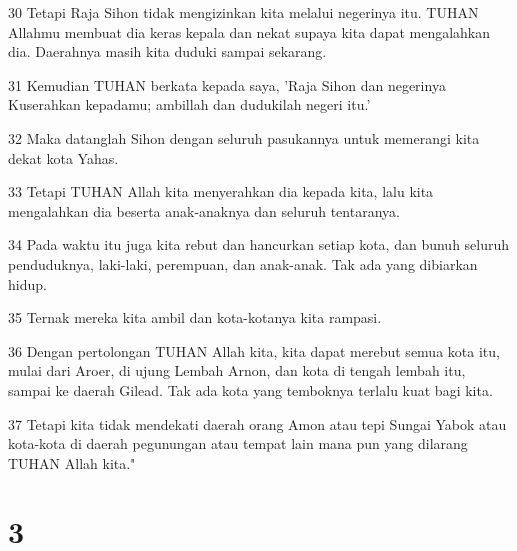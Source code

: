 \par 30 Tetapi Raja Sihon tidak mengizinkan kita melalui negerinya itu. TUHAN Allahmu membuat dia keras kepala dan nekat supaya kita dapat mengalahkan dia. Daerahnya masih kita duduki sampai sekarang.
\par 31 Kemudian TUHAN berkata kepada saya, 'Raja Sihon dan negerinya Kuserahkan kepadamu; ambillah dan dudukilah negeri itu.'
\par 32 Maka datanglah Sihon dengan seluruh pasukannya untuk memerangi kita dekat kota Yahas.
\par 33 Tetapi TUHAN Allah kita menyerahkan dia kepada kita, lalu kita mengalahkan dia beserta anak-anaknya dan seluruh tentaranya.
\par 34 Pada waktu itu juga kita rebut dan hancurkan setiap kota, dan bunuh seluruh penduduknya, laki-laki, perempuan, dan anak-anak. Tak ada yang dibiarkan hidup.
\par 35 Ternak mereka kita ambil dan kota-kotanya kita rampasi.
\par 36 Dengan pertolongan TUHAN Allah kita, kita dapat merebut semua kota itu, mulai dari Aroer, di ujung Lembah Arnon, dan kota di tengah lembah itu, sampai ke daerah Gilead. Tak ada kota yang temboknya terlalu kuat bagi kita.
\par 37 Tetapi kita tidak mendekati daerah orang Amon atau tepi Sungai Yabok atau kota-kota di daerah pegunungan atau tempat lain mana pun yang dilarang TUHAN Allah kita."

\chapter{3}

